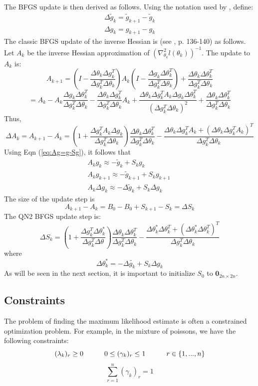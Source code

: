 \documentclass[letter,12pt]{article}
\begin{document}
The BFGS update is then derived as follows.  Using the notation used by \cite{jamshidianj97}, define:
\[
\begin{array}{l}
\Delta \tilde{g}_k = \tilde{g}_{k+1} - \tilde{g}_{k} \\
\Delta g_k = g_{k+1} - g_k
\end{array}
\]
The classic BFGS update of the inverse Hessian is (see \cite{nocedalwright}, p. 136-140) as follows.  Let $A_k$ be the inverse Hessian approximation of $(\nabla^2_{\theta_k}l(\theta_k))^{-1}$.  The update to $A_k$ is:
\[
A_{k+1} = (I - \frac{\Delta \theta_k\Delta g_k^T}{\Delta g_k^T\Delta \theta_k})A_k(I-\frac{\Delta g_k\Delta \theta_k^T}{\Delta g_k^T\Delta \theta_k})+\frac{\Delta \theta_k\Delta \theta_k^T}{\Delta g_k^T\Delta \theta_k}
\]
\[
= A_k - A_k\frac{\Delta g_k\Delta \theta_k^T}{\Delta g_k^T\Delta \theta_k} - \frac{\Delta \theta_k\Delta g_k^T}{\Delta g_k^T\Delta \theta_k}A_k + \frac{\Delta \theta_k\Delta g_k^TA_k\Delta g_k\Delta \theta_k^T}{(\Delta g_k^T\Delta \theta_k)^2}+\frac{\Delta \theta_k\Delta \theta_k^T}{\Delta g_k^T\Delta \theta_k}
\]
Thus,
\[
\Delta A_k = A_{k+1} - A_k
= (1+\frac{\Delta g_k^TA_k\Delta g_k}{\Delta g_k^T\Delta \theta_k})\frac{\Delta \theta_k\Delta \theta_k^T}{\Delta g_k^T\Delta \theta_k} - \frac{\Delta \theta_k\Delta g_k^TA_k + (\Delta \theta_k\Delta g_k^TA_k)^T}{\Delta g_k^T\Delta \theta_k}
\]
Using Eqn (\ref{eq:Ag=g-Sg}), it follows that
\[\begin{array}{c}
A_k  g_k \approx  -\tilde{g}_k + S_kg_k
\\
A_k  g_{k+1} \approx -\tilde{g}_{k+1} + S_kg_{k+1}
\\
A_k \Delta g_k \approx -\Delta \tilde{g}_k + S_k\Delta g_k
\end{array}\
\]
The size of the update step is
\[
A_{k+1} - A_k = B_0 - B_0 + S_{k+1} - S_k = \Delta S_k
\]
The QN2 BFGS update step is:
\begin{equation} \label{eq:BFGS}
\Delta S_k = 
\left(
1 + \frac{\Delta g_k^T \Delta \theta_k^*}{\Delta g_k^T \Delta \theta}
\right)
\frac{\Delta \theta_k \Delta \theta_k^T}{\Delta g_k^T \Delta \theta_k}
-
\frac{\Delta \theta_k^* \Delta \theta_k^T + (\Delta \theta_k^* \Delta \theta_k^T)^T}{\Delta g_k^T \Delta \theta_k}
\end{equation}
where
\[
\Delta \theta_k^* = -\Delta \tilde{g_k} + S_k \Delta g_k
\]
As will be seen in the next section, it is important to initialize $S_0$ to $\boldsymbol{0}_{2n \times 2n}$.

\subsection{Constraints}
The problem of finding the maximum likelihood estimate is often a constrained optimization problem.  For example, in the mixture of poissons, we have the following constraints:
\[
(\lambda_k)_r \geq 0 \indent \indent
0 \leq (\gamma_k)_r \leq 1 \indent \indent
r \in \{1,...,n\}
\]
\begin{equation} \label{eqn:equalityconstraint}
\sum_{r=1}^{n} (\gamma_k)_r = 1
\end{equation}
\end{document}
